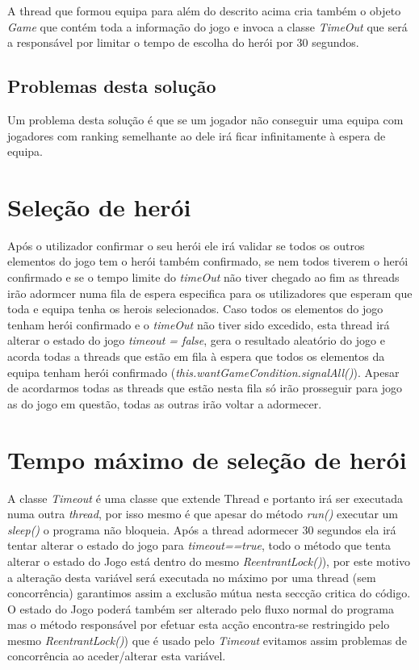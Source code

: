 A thread que formou equipa para além do descrito acima cria também o objeto \textit{Game} que contém toda a informação do jogo e  invoca a classe \textit{TimeOut} que será a responsável por limitar o tempo de escolha do herói por 30 segundos. 

\subsection{Problemas desta solução}
Um problema desta solução é que se um jogador não conseguir uma equipa com jogadores com ranking semelhante ao dele irá ficar infinitamente à espera de equipa.


\section{Seleção de herói}

Após o utilizador confirmar o seu herói ele irá validar se todos os outros elementos do jogo tem o herói também confirmado, se nem todos tiverem o herói confirmado e se o tempo limite do \textit{timeOut} não tiver chegado ao fim as threads irão adormcer numa fila de espera especifica para os utilizadores que esperam que toda e equipa tenha os herois selecionados. Caso todos os elementos do jogo tenham herói confirmado e o \textit{timeOut} não tiver sido excedido, esta thread irá alterar o estado do jogo \textit{timeout = false}, gera o resultado aleatório do jogo e acorda todas a threads que estão em fila à espera que todos os elementos da equipa tenham herói confirmado (\textit{this.wantGameCondition.signalAll()}). Apesar de acordarmos todas as threads que estão nesta fila só irão prosseguir para jogo as do jogo em questão, todas as outras irão voltar a adormecer. 

\section{Tempo máximo de seleção de herói}

A classe \textit{Timeout} é uma classe que extende Thread e portanto irá ser executada numa outra \textit{thread}, por isso mesmo é que apesar do método \textit{run()} executar um \textit{sleep()} o programa não bloqueia. Após a thread adormecer 30 segundos ela irá tentar alterar o estado do jogo para \textit{timeout==true}, todo o método que tenta alterar o estado do Jogo está dentro do mesmo \textit{ReentrantLock()}), por este motivo a alteração desta variável será executada no máximo por uma thread (sem concorrência) garantimos assim a exclusão mútua nesta seccção critica do código. O estado do Jogo poderá também ser alterado pelo fluxo normal do programa mas o método responsável por efetuar esta acção encontra-se restringido pelo mesmo \textit{ReentrantLock()}) que é usado pelo \textit{Timeout} evitamos assim problemas de concorrência ao aceder/alterar esta variável. 

